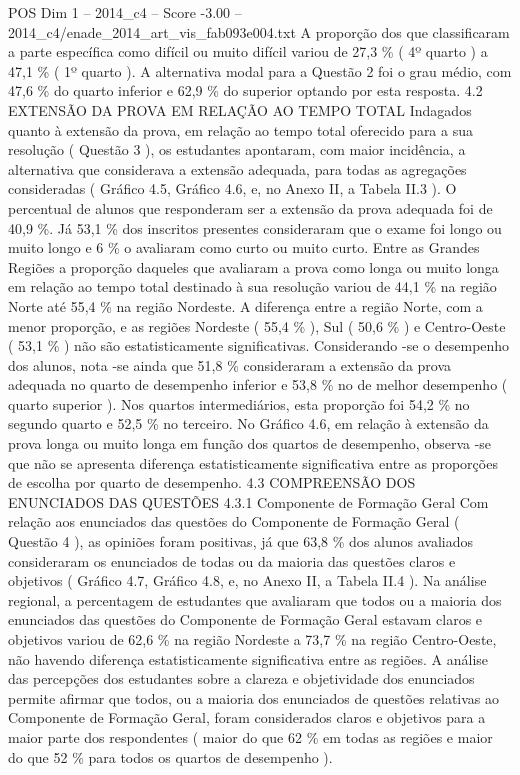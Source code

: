\begin{textsample}{POS Dim 1 – 2014\_c4 – Score -3.00 – 2014\_c4/enade\_2014\_art\_vis\_fab093e004.txt}
A proporção dos que classificaram a parte específica como difícil ou muito difícil variou de 27,3 \% ( 4º quarto ) a 47,1 \% ( 1º quarto ).
A alternativa modal para a Questão 2 foi o grau médio, com 47,6 \% do quarto inferior e 62,9 \% do superior optando por esta resposta. 4.2 EXTENSÃO DA PROVA EM RELAÇÃO AO TEMPO TOTAL Indagados quanto à extensão da prova, em relação ao tempo total oferecido para a sua resolução ( Questão 3 ), os estudantes apontaram, com maior incidência, a alternativa que considerava a extensão adequada, para todas as agregações consideradas ( Gráfico 4.5, Gráfico 4.6, e, no Anexo II, a Tabela II.3 ).
O percentual de alunos que responderam ser a extensão da prova adequada foi de 40,9 \%.
Já 53,1 \% dos inscritos presentes consideraram que o exame foi longo ou muito longo e 6 \% o avaliaram como curto ou muito curto.
Entre as Grandes Regiões a proporção daqueles que avaliaram a prova como longa ou muito longa em relação ao tempo total destinado à sua resolução variou de 44,1 \% na região Norte até 55,4 \% na região Nordeste.
A diferença entre a região Norte, com a menor proporção, e as regiões Nordeste ( 55,4 \% ), Sul ( 50,6 \% ) e Centro-Oeste ( 53,1 \% ) não são estatisticamente significativas.
Considerando -se o desempenho dos alunos, nota -se ainda que 51,8 \% consideraram a extensão da prova adequada no quarto de desempenho inferior e 53,8 \% no de melhor desempenho ( quarto superior ).
Nos quartos intermediários, esta proporção foi 54,2 \% no segundo quarto e 52,5 \% no terceiro.
No Gráfico 4.6, em relação à extensão da prova longa ou muito longa em função dos quartos de desempenho, observa -se que não se apresenta diferença estatisticamente significativa entre as proporções de escolha por quarto de desempenho. 4.3 COMPREENSÃO DOS ENUNCIADOS DAS QUESTÕES 4.3.1 Componente de Formação Geral Com relação aos enunciados das questões do Componente de Formação Geral ( Questão 4 ), as opiniões foram positivas, já que 63,8 \% dos alunos avaliados consideraram os enunciados de todas ou da maioria das questões claros e objetivos ( Gráfico 4.7, Gráfico 4.8, e, no Anexo II, a Tabela II.4 ).
Na análise regional, a percentagem de estudantes que avaliaram que todos ou a maioria dos enunciados das questões do Componente de Formação Geral estavam claros e objetivos variou de 62,6 \% na região Nordeste a 73,7 \% na região Centro-Oeste, não havendo diferença estatisticamente significativa entre as regiões.
A análise das percepções dos estudantes sobre a clareza e objetividade dos enunciados permite afirmar que todos, ou a maioria dos enunciados de questões relativas ao Componente de Formação Geral, foram considerados claros e objetivos para a maior parte dos respondentes ( maior do que 62 \% em todas as regiões e maior do que 52 \% para todos os quartos de desempenho ).

\end{textsample}
